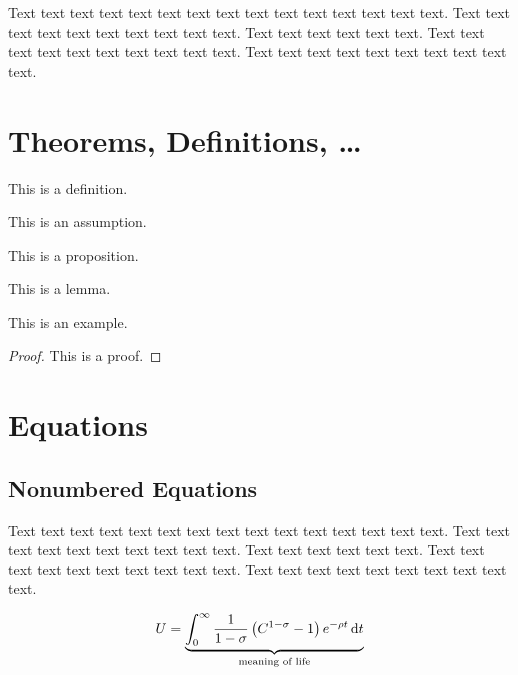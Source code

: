 Text text text text text text text text text text text text text text text. Text text text text text text text text text text. Text text text text text text. Text text text text text text text text text text. Text text text text text text text text text text.

\section{Theorems, Definitions, \ldots}

\begin{defin}\label{de:definice1}
This is a definition.
\end{defin}

\begin{ass}\label{as:predpoklad1}
This is an assumption.
\end{ass}

\begin{prop}\label{pr:veta1}
This is a proposition.
\end{prop}

\begin{lemma}\label{le:lemma1}
This is a lemma.
\end{lemma}

\begin{exam}\label{ex:priklad1}
This is an example.
\end{exam}

\begin{proof}
This is a proof.
\end{proof}

\section{Equations}
\label{rovnice}

\subsection{Nonumbered Equations}

Text text text text text text text text text text text text text text text. Text text text text text text text text text text. Text text text text text text. Text text text text text text text text text text. Text text text text text text text text text text.

    \[ U = \underbrace{\int_0^{\infty} \frac{1}{1-\sigma}\left(C^{1-\sigma} -1 \right) e^{-\rho t} \,\mathrm{d} t}_\text{meaning of life} \]

